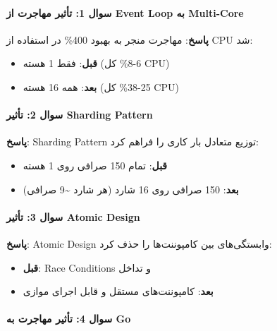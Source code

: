 \documentclass[
]{article}
\providecommand{\tightlist}{%
  \setlength{\itemsep}{0pt}\setlength{\parskip}{0pt}}
\begin{document}
\paragraph{سوال 1: تأثیر مهاجرت از Event Loop به
Multi-Core}\label{ux633ux648ux627ux644-1-ux62aux623ux62bux6ccux631-ux645ux647ux627ux62cux631ux62a-ux627ux632-event-loop-ux628ux647-multi-core}

\textbf{پاسخ}: مهاجرت منجر به بهبود 400\% در استفاده از CPU شد:

\begin{itemize}
\tightlist
\item
  \textbf{قبل}: فقط 1 هسته (6-8\% کل CPU)
\item
  \textbf{بعد}: همه 16 هسته (25-38\% کل CPU)
\end{itemize}

\paragraph{سوال 2: تأثیر Sharding
Pattern}\label{ux633ux648ux627ux644-2-ux62aux623ux62bux6ccux631-sharding-pattern}

\textbf{پاسخ}: Sharding Pattern توزیع متعادل بار کاری را فراهم کرد:

\begin{itemize}
\tightlist
\item
  \textbf{قبل}: تمام 150 صرافی روی 1 هسته
\item
  \textbf{بعد}: 150 صرافی روی 16 شارد (هر شارد \textasciitilde9 صرافی)
\end{itemize}

\paragraph{سوال 3: تأثیر Atomic
Design}\label{ux633ux648ux627ux644-3-ux62aux623ux62bux6ccux631-atomic-design}

\textbf{پاسخ}: Atomic Design وابستگی‌های بین کامپوننت‌ها را حذف کرد:

\begin{itemize}
\tightlist
\item
  \textbf{قبل}: Race Conditions و تداخل
\item
  \textbf{بعد}: کامپوننت‌های مستقل و قابل اجرای موازی
\end{itemize}

\paragraph{سوال 4: تأثیر مهاجرت به
Go}\label{ux633ux648ux627ux644-4-ux62aux623ux62bux6ccux631-ux645ux647ux627ux62cux631ux62a-ux628ux647-go}
\end{document}
